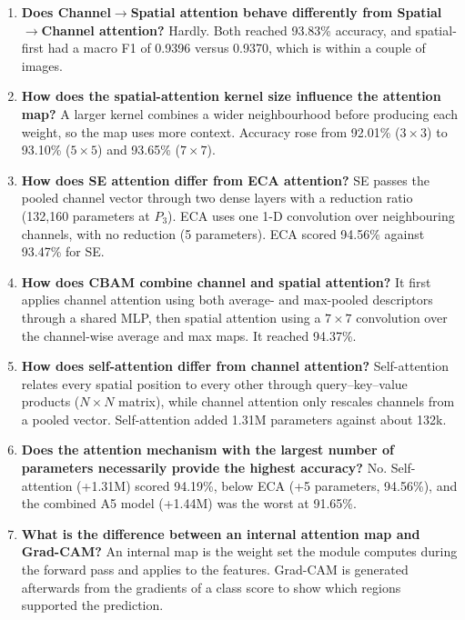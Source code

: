 \documentclass[11pt]{article}
\begin{document}
\begin{enumerate}
\item \textbf{Does Channel$\rightarrow$Spatial attention behave differently from Spatial$\rightarrow$Channel attention?}
Hardly. Both reached 93.83\% accuracy, and spatial-first had a macro F1 of
0.9396 versus 0.9370, which is within a couple of images.

\item \textbf{How does the spatial-attention kernel size influence the attention map?}
A larger kernel combines a wider neighbourhood before producing each weight,
so the map uses more context. Accuracy rose from 92.01\% ($3\times3$) to
93.10\% ($5\times5$) and 93.65\% ($7\times7$).

\item \textbf{How does SE attention differ from ECA attention?}
SE passes the pooled channel vector through two dense layers with a
reduction ratio (132{,}160 parameters at $P_3$). ECA uses one 1-D convolution
over neighbouring channels, with no reduction (5 parameters). ECA scored
94.56\% against 93.47\% for SE.

\item \textbf{How does CBAM combine channel and spatial attention?}
It first applies channel attention using both average- and max-pooled
descriptors through a shared MLP, then spatial attention using a $7\times7$
convolution over the channel-wise average and max maps. It reached 94.37\%.

\item \textbf{How does self-attention differ from channel attention?}
Self-attention relates every spatial position to every other through
query--key--value products ($N\times N$ matrix), while channel attention only
rescales channels from a pooled vector. Self-attention added 1.31M
parameters against about 132k.

\item \textbf{Does the attention mechanism with the largest number of parameters necessarily provide the highest accuracy?}
No. Self-attention (+1.31M) scored 94.19\%, below ECA (+5 parameters,
94.56\%), and the combined A5 model (+1.44M) was the worst at 91.65\%.

\item \textbf{What is the difference between an internal attention map and Grad-CAM?}
An internal map is the weight set the module computes during the forward
pass and applies to the features. Grad-CAM is generated afterwards from the
gradients of a class score to show which regions supported the prediction.


\end{enumerate}
\end{document}
